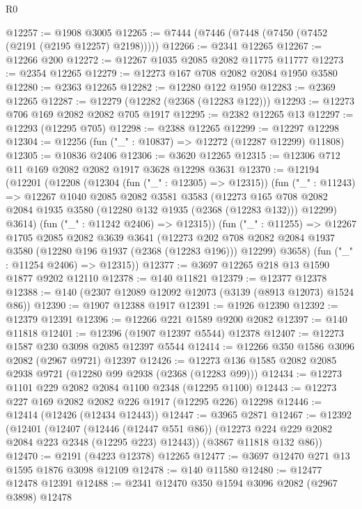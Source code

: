 \begin{lexlean}{R0}
\begin{coremodule}
@12257 := @1908 @3005
@12265 := @7444 (@7446 (@7448 (@7450 (@7452 (@2191 (@2195 @12257) @2198)))))
@12266 := @2341 @12265
@12267 := @12266 @200
@12272 := @12267 @1035 @2085 @2082 @11775 @11777
@12273 := @2354 @12265
@12279 := @12273 @167 @708 @2082 @2084 @1950 @3580
@12280 := @2363 @12265
@12282 := @12280 @122 @1950
@12283 := @2369 @12265
@12287 := @12279 (@12282 (@2368 (@12283 @122)))
@12293 := @12273 @706 @169 @2082 @2082 @705 @1917
@12295 := @2382 @12265 @13
@12297 := @12293 (@12295 @705)
@12298 := @2388 @12265
@12299 := @12297 @12298
@12304 := @12256 (fun ("_" : @10837) => @12272 (@12287 @12299) @11808)
@12305 := @10836 @2406
@12306 := @3620 @12265
@12315 := @12306 @712 @11 @169 @2082 @2082 @1917 @3628 @12298 @3631
@12370 := @12194
    (@12201
      (@12208
        (@12304 (fun ("_" : @12305) => @12315))
        (fun ("_" : @11243) =>
        @12267
          @1040
          @2085
          @2082
          @3581
          @3583
          (@12273
            @165
            @708
            @2082
            @2084
            @1935
            @3580
            (@12280 @132 @1935 (@2368 (@12283 @132)))
            @12299)
          @3614)
        (fun ("_" : @11242 @2406) => @12315))
      (fun ("_" : @11255) =>
      @12267
        @1705
        @2085
        @2082
        @3639
        @3641
        (@12273 @202 @708 @2082 @2084 @1937 @3580 (@12280 @196 @1937 (@2368 (@12283 @196))) @12299)
        @3658)
      (fun ("_" : @11254 @2406) => @12315))
@12377 := @3697 @12265 @218 @13 @1590 @1877 @9202 @12110
@12378 := @140 @11821
@12379 := @12377 @12378
@12388 := @140 (@2307 @12089 @12092 @12073 (@3139 (@8913 @12073) @1524 @86))
@12390 := @1907 @12388 @1917
@12391 := @1926 @12390
@12392 := @12379 @12391
@12396 := @12266 @221 @1589 @9200 @2082
@12397 := @140 @11818
@12401 := @12396 (@1907 @12397 @5544) @12378
@12407 := @12273 @1587 @230 @3098 @2085 @12397 @5544
@12414 := @12266 @350 @1586 @3096 @2082 (@2967 @9721) @12397
@12426 := @12273 @136 @1585 @2082 @2085 @2938 @9721 (@12280 @99 @2938 (@2368 (@12283 @99)))
@12434 := @12273 @1101 @229 @2082 @2084 @1100 @2348 (@12295 @1100)
@12443 := @12273 @227 @169 @2082 @2082 @226 @1917 (@12295 @226) @12298
@12446 := @12414 (@12426 (@12434 @12443))
@12447 := @3965 @2871
@12467 := @12392
    (@12401
      (@12407
        (@12446 (@12447 @551 @86))
        (@12273 @224 @229 @2082 @2084 @223 @2348 (@12295 @223) @12443))
      (@3867 @11818 @132 @86))
@12470 := @2191 (@4223 @12378) @12265
@12477 := @3697 @12470 @271 @13 @1595 @1876 @3098 @12109
@12478 := @140 @11580
@12480 := @12477 @12478 @12391
@12488 := @2341 @12470 @350 @1594 @3096 @2082 (@2967 @3898) @12478

\end{coremodule}
\end{lexlean}
